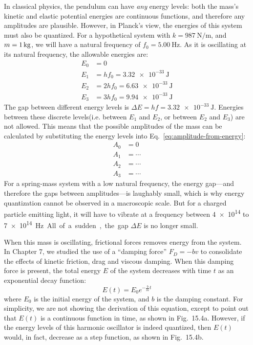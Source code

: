 In classical physics, the pendulum can have \emph{any} energy levels: both the
mass's kinetic and elastic potential energies are continuous functions, and
therefore any amplitudes are plausible. However, in Planck's view, the energies
of this system must also be quantized. For a hypothetical system with
$k=\SI{987}{\newton\per\metre}$, and $m=\SI1{\kilo\gram}$, we will have a
natural frequency of $f_0=\SI{5.00}\hertz$. As it is oscillating at its natural
frequency, the allowable energies are:
\begin{align*}
  E_0 &= 0\\
  E_1 &= hf_0  = \SI{3.32e-33}\joule\\
  E_2 &= 2hf_0 = \SI{6.63e-33}\joule\\
  E_3 &= 3hf_0 = \SI{9.94e-33}\joule
\end{align*}
The gap between different energy levels is $\Delta E=hf=\SI{3.32e-33}\joule$.
Energies between these discrete levels(i.e. between $E_1$ and $E_2$, or between
$E_2$ and $E_3$) are not allowed. This means that the possible amplitudes of
the mass can be calculated by substituting the energy levels into
Eq.~\ref{eq:amplitude-from-energy}:
\begin{align*}
  A_0 &= 0\\
  A_1 &= \cdots\\
  A_2 &= \cdots\\
  A_3 &= \cdots
\end{align*}
For a spring-mass system with a low natural frequency, the energy gap---and
therefore the gaps between amplitudes---is laughably small, which is why energy
quantization cannot be observed in a macroscopic scale. But for a charged
particle emitting light, it will have to vibrate at a frequency between
\num{4e14} to \SI{7e14}\hertz. All of a sudden, the gap $\Delta E$ is no
longer small.

When this mass is oscillating, frictional forces removes energy from the
system. In Chapter 7, we studied the use of a ``damping force'' $F_D=-bv$ to
consolidate the effects of kinetic friction, drag and viscous damping. When
this damping force is present, the total energy $E$ of the system decreases
with time $t$ as an exponential decay function:
\begin{equation}
  E(t)=E_0e^{-\frac bmt} %
\end{equation}
where $E_0$ is the initial energy of the system, and $b$ is the damping
constant. For simplicity, we are not showing the derivation of this equation,
except to point out that $E(t)$ is a continuous function in time, as shown in
Fig.\ 15.4a. However, if the energy levels of this harmonic oscillator is
indeed quantized, then $E(t)$ would, in fact, decrease as a step function, as
shown in Fig.\ 15.4b.


